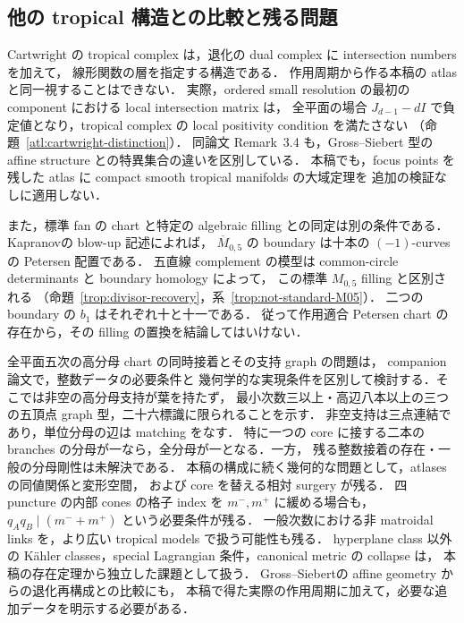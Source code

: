 \subsection{他の tropical 構造との比較と残る問題}

Cartwright の tropical complex は，退化の dual complex に intersection numbers を加えて，
線形関数の層を指定する構造である\cite[Definitions~2.5, 2.8; Construction~3.2]{CartwrightComplexes}．
作用周期から作る本稿の atlas と同一視することはできない．
実際，ordered small resolution の最初の component における local intersection matrix は，
全平面の場合 $J_{d-1}-dI$ で負定値となり，tropical complex の local positivity condition を満たさない
（命題~\ref{atl:cartwright-distinction}）．
同論文 Remark~3.4 も，Gross--Siebert 型の affine structure との特異集合の違いを区別している．
本稿でも，focus points を残した atlas に compact smooth tropical manifolds の大域定理を
追加の検証なしに適用しない．

また，標準 fan の chart と特定の algebraic filling との同定は別の条件である．
Kapranov\cite[Theorem~4.3.3]{KapranovChow}の blow-up 記述によれば，
$\overline M_{0,5}$ の boundary は十本の $(-1)$-curves の Petersen 配置である．
五直線 complement の模型は common-circle determinants と boundary homology によって，
この標準 $M_{0,5}$ filling と区別される
（命題~\ref{trop:divisor-recovery}，系~\ref{trop:not-standard-M05}）．
二つの boundary の $b_1$ はそれぞれ十と十一である．
従って作用適合 Petersen chart の存在から，その filling の置換を結論してはいけない．

全平面五次の高分母 chart の同時接着とその支持 graph の問題は，
companion 論文\cite{QuinticArithmetic}で，整数データの必要条件と
幾何学的な実現条件を区別して検討する．そこでは非空の高分母支持が葉を持たず，
最小次数三以上・高辺八本以上の三つの五頂点 graph 型，二十六標識に限られることを示す．
非空支持は三点連結であり，単位分母の辺は matching をなす．
特に一つの core に接する二本の branches の分母が一なら，全分母が一となる．一方，
残る整数接着の存在・一般の分母剛性は未解決である．
本稿の構成に続く幾何的な問題として，atlases の同値関係と変形空間，
および core を替える相対 surgery が残る．
四 puncture の内部 cones の格子 index を $m^-,m^+$ に緩める場合も，
$q_Aq_B\mid(m^-+m^+)$ という必要条件が残る．
一般次数における非 matroidal links を，より広い tropical models で扱う可能性も残る．
hyperplane class 以外の Kähler classes，special Lagrangian 条件，canonical metric の collapse は，
本稿の存在定理から独立した課題として扱う．
Gross--Siebert\cite{GrossSiebert}の affine geometry からの退化再構成との比較にも，
本稿で得た実際の作用周期に加えて，必要な追加データを明示する必要がある．
